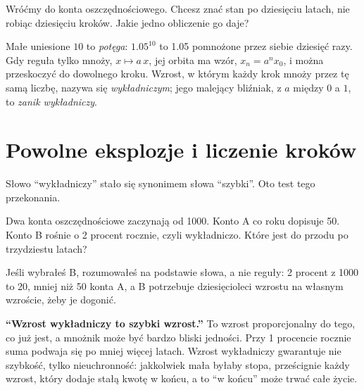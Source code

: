 \begin{think}
Wróćmy do konta oszczędnościowego. Chcesz znać stan po dziesięciu latach,
nie robiąc dziesięciu kroków. Jakie jedno obliczenie go daje?
\end{think}
Małe uniesione $10$ to \emph{potęga}: $\num{1.05}^{10}$ to \num{1.05}
pomnożone przez siebie dziesięć razy. Gdy reguła tylko mnoży, $x \mapsto
a\,x$, jej orbita ma wzór, $x_n = a^n x_0$, i można przeskoczyć do
dowolnego kroku. Wzrost, w którym każdy krok mnoży przez tę samą liczbę,
nazywa się \emph{wykładniczym}; jego malejący bliźniak, z $a$ między $0$ a
$1$, to \emph{zanik wykładniczy}.

\section{Powolne eksplozje i liczenie kroków}
\label{sec:ch02-until}

\noindent
Słowo \enquote{wykładniczy} stało się synonimem słowa \enquote{szybki}. Oto
test tego przekonania.

\begin{think}
Dwa konta oszczędnościowe zaczynają od 1000. Konto A co roku dopisuje 50.
Konto B rośnie o 2 procent rocznie, czyli wykładniczo. Które jest do przodu
po trzydziestu latach?
\end{think}
Jeśli wybrałeś B, rozumowałeś na podstawie słowa, a nie reguły: 2 procent z
1000 to 20, mniej niż 50 konta A, a B potrzebuje dziesięcioleci wzrostu na
własnym wzroście, żeby je dogonić.

\begin{trapbox}
\textbf{\enquote{Wzrost wykładniczy to szybki wzrost.}} To wzrost
proporcjonalny do tego, co już jest, a mnożnik może być bardzo bliski
jedności. Przy 1 procencie rocznie suma podwaja się po mniej więcej
 latach. Wzrost wykładniczy gwarantuje nie szybkość,
tylko nieuchronność: jakkolwiek mała byłaby stopa, prześcignie każdy
wzrost, który dodaje stałą kwotę \dash{} w końcu, a to \enquote{w końcu}
może trwać całe życie.
\end{trapbox}


